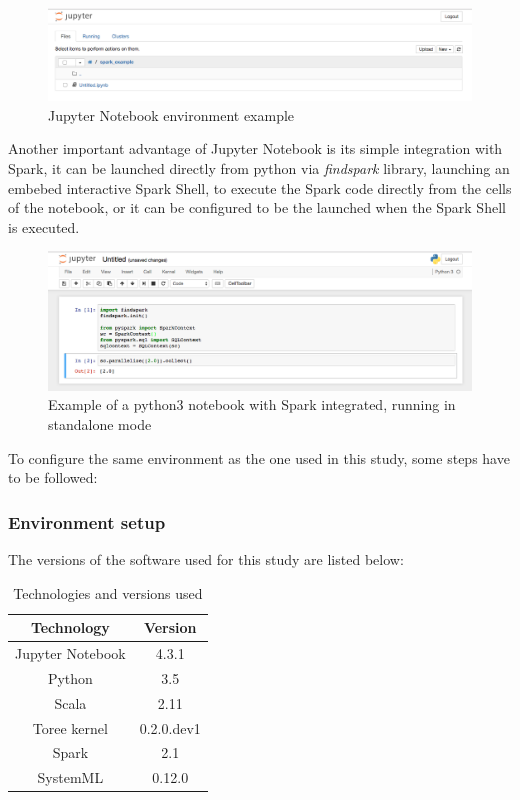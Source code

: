 \documentclass[11pt]{article} %
\begin{document}
    \begin{figure}[!ht]
      \centering
      \includegraphics[width=\textwidth]{jupyter_notebook.png}
      \caption{Jupyter Notebook environment example}
      \label{jupyter_notebook_environment}
    \end{figure}

    Another important advantage of Jupyter Notebook is its simple integration with Spark, it can be launched directly from python via \emph{findspark} library, launching an embebed interactive Spark Shell, to execute the Spark code directly from the cells of the notebook, or it can be configured to be the launched when the Spark Shell is executed.

    \begin{figure}[!ht]
      \centering
      \includegraphics[width=\textwidth]{spark_notebook_example.png}
      \caption{Example of a python3 notebook with Spark integrated, running in standalone mode}
      \label{notebook_spark_example}
    \end{figure}

    To configure the same environment as the one used in this study, some steps have to be followed:

    \subsubsection{Environment setup}

      The versions of the software used for this study are listed below:

    \begin{table}[!ht]
      \centering
      \begin{tabular}{| c | c |}
        \hline

        Technology & Version \\ \hline
        Jupyter Notebook & 4.3.1 \\ \hline
        Python & 3.5 \\ \hline
        Scala & 2.11 \\ \hline
        Toree kernel & 0.2.0.dev1 \\ \hline
        Spark & 2.1 \\ \hline
        SystemML & 0.12.0 \\

        \hline
      \end{tabular}
      \caption{Technologies and versions used}
    \end{table}
\end{document}
